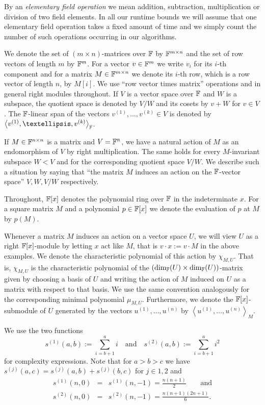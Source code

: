 By an \emph{elementary field operation} 
%
we mean addition, subtraction, multiplication or division of two field 
elements.
In all our runtime bounds we will assume that one elementary
field operation takes a fixed amount of time and we simply count
the number of such operations occurring in our algorithms.

We denote the set of $(m \times n)$-matrices over $\mathbb{F}$ by $\mathbb{F}^{m \times n}$
and the set of row vectors of length $m$ by $\mathbb{F}^m$. For a vector
$v \in \mathbb{F}^m$ we write $v_i$ for its $i$-th component and for a matrix 
$M \in \mathbb{F}^{m \times n}$ we denote its $i$-th row, which is
a row vector of length $n$, by $M[i]$. We use ``row vector
times matrix'' operations and in general right modules throughout.
If $V$ is a vector space over $\mathbb{F}$ and $W$ is a subspace, the
quotient space is denoted by $V/W$ and its cosets by
$v+W$ for $v \in V$. The $\mathbb{F}$-linear span of the vectors
$v^{(1)}, \ldots, v^{(k)} \in V$ is denoted by 
$\left< v^{(1)}, \ldots, v^{(k)}\right>_\F$.

If $M \in \mathbb{F}^{n \times n}$ is a matrix and $V = \mathbb{F}^n$, we have a
natural action of $M$ as an endomorphism of $V$ by right multiplication.
The same holds for every $M$-invariant subspace $W < V$ and for
the corresponding quotient space $V/W$. We describe such a situation
by saying that ``the matrix $M$ induces an action on the $\mathbb{F}$-vector space''
$V, W, V/W$ respectively.

Throughout, $\mathbb{F}[x]$ denotes
the polynomial ring over $\mathbb{F}$ in the indeterminate $x$. For a square matrix $M$ and
a polynomial $p \in \mathbb{F}[x]$ we denote the evaluation of $p$ at $M$
by $p(M)$.

Whenever a matrix $M$ induces an action on a vector space $U$, we
will view $U$ as a right $\mathbb{F}[x]$-module by letting $x$ act like $M$,
that is $v \cdot x := v\cdot M$ in the above examples. We denote the
characteristic polynomial of this action by $\chi_{M,U}$. That is,
$\chi_{M,U}$ is the characteristic polynomial 
of the $(\dim_{\mathbb{F}}(U) \times \dim_{\mathbb{F}}(U))$-matrix given by choosing 
a basis of $U$ and writing the
action of $M$ induced on $U$ as a matrix with respect to that basis.
We use the same convention analogously for the corresponding minimal
polynomial $\mu_{M,U}$. Furthermore, we denote the $\mathbb{F}[x]$-submodule of
$U$ generated by the vectors $u^{(1)}, \ldots, u^{(n)}$ by $\left< u^{(1)}, \ldots,
u^{(n)} \right>_M$.

We use the two functions 
\begin{equation}\label{si}
s^{(1)}(a,b) := \sum_{i=b+1}^a i\quad \mbox{and}\quad
s^{(2)}(a,b) := \sum_{i=b+1}^a i^2
\end{equation}
for complexity expressions.
Note that for $a > b > c$ we have $s^{(j)}(a,c) = s^{(j)}(a,b) + s^{(j)}(b,c)$
for $j \in {1,2}$ and 
\begin{eqnarray}
\label{formels1}
s^{(1)}(n,0) &=& s^{(1)}(n,-1) = \frac{n(n+1)}{2}
\qquad\mbox{and} \\
\label{formels2}
s^{(2)}(n,0) &=& s^{(2)}(n,-1) = \frac{n(n+1)(2n+1)}{6}.
\end{eqnarray}

